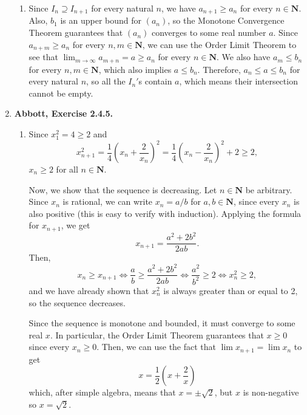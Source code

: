 \documentclass{article}
\newcommand{\N}{\mathbf{N}}
\newcommand{\exc}[2][Abbott]{\item \textbf{#1, Exercise #2.}}
\begin{document}
\begin{enumerate}
\begin{enumerate}
        \item Since $I_{n} \supseteq I_{n+1}$ for every natural $n$, we have $a_{n+1} \geq a_n$ for every $n \in \N$. Also, $b_1$ is an upper bound for $(a_n)$, so the Monotone Convergence Theorem guarantees that $(a_n)$ converges to some real number $a$. Since $a_{n+m} \geq a_n$ for every $n,m \in \N$, we can use the Order Limit Theorem to see that $\lim_{m \to \infty} a_{m+n} = a \geq a_n$ for every $n \in \N$. We also have $a_m \leq b_n$ for every $n, m \in \N$, which also implies $a \leq b_n$. Therefore, $a_n \leq a \leq b_n$ for every natural $n$, so all the $I_n'$s contain $a$, which means their intersection cannot be empty.
    \end{enumerate}
    
    \exc{2.4.5}
    \begin{enumerate}
        \item Since $x_1^2 = 4 \geq 2$ and
        \begin{equation*}
            x_{n+1}^2 = \frac{1}{4}\left(x_n+\frac{2}{x_n}\right)^2 = 
            \frac{1}{4}\left(x_n-\frac{2}{x_n}\right)^2 + 2 \geq 2,
        \end{equation*} $x_n \geq 2$ for all $n \in \N$.
        
        Now, we show that the sequence is decreasing. Let $n \in \N$ be arbitrary. Since $x_n$ is rational, we can write $x_n = a/b$ for $a,b \in \N$, since every $x_n$ is also positive (this is easy to verify with induction). Applying the formula for $x_{n+1}$, we get 
        \begin{equation*}
            x_{n+1} = \frac{a^2+2b^2}{2ab}.
        \end{equation*}
        Then, 
        \begin{equation*}
            x_n \geq x_{n+1} \iff \frac{a}{b} \geq \frac{a^2+2b^2}{2ab} \iff
            \frac{a^2}{b^2} \geq 2 \iff x_n^2 \geq 2,
        \end{equation*} and we have already shown that $x_n^2$ is always greater than or equal to 2, so the sequence decreases.
        
        Since the sequence is monotone and bounded, it must converge to some real $x$. In particular, the Order Limit Theorem guarantees that $x \geq 0$ since every $x_n \geq 0$.
        Then, we can use the fact that $\lim x_{n+1} = \lim x_n$ to get 
        \begin{equation*}
            x = \frac{1}{2} \left(x + \frac{2}{x}\right)
        \end{equation*} which, after simple algebra, means that $x = \pm \sqrt{2}$, but $x$ is non-negative so $x = \sqrt{2}$.
        

\end{enumerate}
\end{enumerate}
\end{document}
